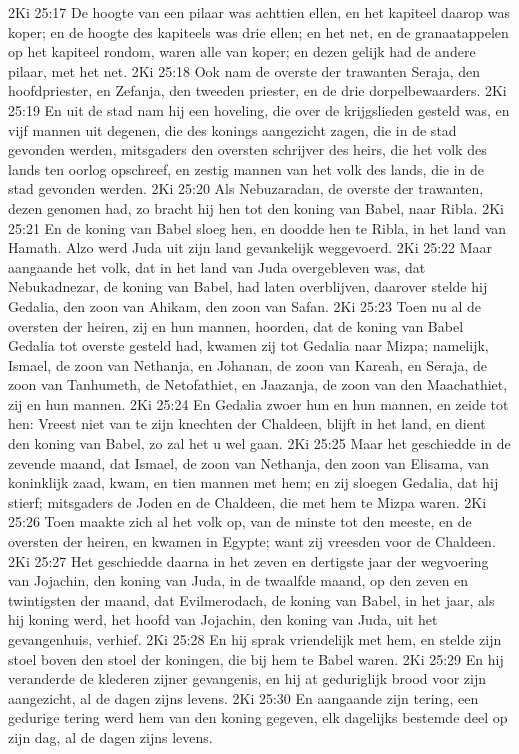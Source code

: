 2Ki 25:17  De hoogte van een pilaar was achttien ellen, en het kapiteel daarop was koper; en de hoogte des kapiteels was drie ellen; en het net, en de granaatappelen op het kapiteel rondom, waren alle van koper; en dezen gelijk had de andere pilaar, met het net.
2Ki 25:18  Ook nam de overste der trawanten Seraja, den hoofdpriester, en Zefanja, den tweeden priester, en de drie dorpelbewaarders.
2Ki 25:19  En uit de stad nam hij een hoveling, die over de krijgslieden gesteld was, en vijf mannen uit degenen, die des konings aangezicht zagen, die in de stad gevonden werden, mitsgaders den oversten schrijver des heirs, die het volk des lands ten oorlog opschreef, en zestig mannen van het volk des lands, die in de stad gevonden werden.
2Ki 25:20  Als Nebuzaradan, de overste der trawanten, dezen genomen had, zo bracht hij hen tot den koning van Babel, naar Ribla.
2Ki 25:21  En de koning van Babel sloeg hen, en doodde hen te Ribla, in het land van Hamath. Alzo werd Juda uit zijn land gevankelijk weggevoerd.
2Ki 25:22  Maar aangaande het volk, dat in het land van Juda overgebleven was, dat Nebukadnezar, de koning van Babel, had laten overblijven, daarover stelde hij Gedalia, den zoon van Ahikam, den zoon van Safan.
2Ki 25:23  Toen nu al de oversten der heiren, zij en hun mannen, hoorden, dat de koning van Babel Gedalia tot overste gesteld had, kwamen zij tot Gedalia naar Mizpa; namelijk, Ismael, de zoon van Nethanja, en Johanan, de zoon van Kareah, en Seraja, de zoon van Tanhumeth, de Netofathiet, en Jaazanja, de zoon van den Maachathiet, zij en hun mannen.
2Ki 25:24  En Gedalia zwoer hun en hun mannen, en zeide tot hen: Vreest niet van te zijn knechten der Chaldeen, blijft in het land, en dient den koning van Babel, zo zal het u wel gaan.
2Ki 25:25  Maar het geschiedde in de zevende maand, dat Ismael, de zoon van Nethanja, den zoon van Elisama, van koninklijk zaad, kwam, en tien mannen met hem; en zij sloegen Gedalia, dat hij stierf; mitsgaders de Joden en de Chaldeen, die met hem te Mizpa waren.
2Ki 25:26  Toen maakte zich al het volk op, van de minste tot den meeste, en de oversten der heiren, en kwamen in Egypte; want zij vreesden voor de Chaldeen.
2Ki 25:27  Het geschiedde daarna in het zeven en dertigste jaar der wegvoering van Jojachin, den koning van Juda, in de twaalfde maand, op den zeven en twintigsten der maand, dat Evilmerodach, de koning van Babel, in het jaar, als hij koning werd, het hoofd van Jojachin, den koning van Juda, uit het gevangenhuis, verhief.
2Ki 25:28  En hij sprak vriendelijk met hem, en stelde zijn stoel boven den stoel der koningen, die bij hem te Babel waren.
2Ki 25:29  En hij veranderde de klederen zijner gevangenis, en hij at geduriglijk brood voor zijn aangezicht, al de dagen zijns levens.
2Ki 25:30  En aangaande zijn tering, een gedurige tering werd hem van den koning gegeven, elk dagelijks bestemde deel op zijn dag, al de dagen zijns levens.




